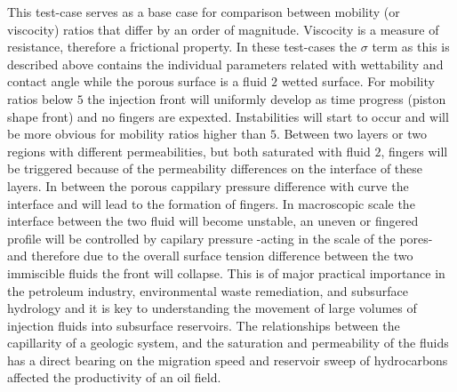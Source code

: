 \documentclass[preprint,authoryear,12pt]{elsarticle}
\begin{document}
{This test-case serves as a base case for comparison between mobility (or viscocity) ratios that differ by an order of magnitude. Viscocity is a measure of resistance, therefore a frictional property. In these test-cases the $\sigma$ term as this is described above contains the individual parameters related with wettability and contact angle while the porous surface is a fluid $2$ wetted surface. For mobility ratios below $5$ the injection front will uniformly develop as time progress (piston shape front) and no fingers are expexted. Instabilities will start to occur and will be more obvious for mobility ratios higher than $5$. Between two layers or two regions with different permeabilities, but both saturated with fluid $2$, fingers will be triggered because of the permeability differences on the interface of these layers. In between the porous cappilary pressure difference with curve the interface and will lead to the formation of fingers. In macroscopic scale the interface between the two fluid will become unstable, an uneven or fingered profile will be controlled by capilary pressure -acting in the scale of the pores- and therefore due to the overall surface tension difference between the two immiscible fluids the front will collapse. This is of major practical importance in the petroleum industry, environmental waste remediation, and subsurface hydrology and it is key to understanding the movement of large volumes of injection fluids into subsurface reservoirs. The relationships between the capillarity of a geologic system, and the saturation and permeability of the fluids has a direct bearing on the migration speed and reservoir sweep of hydrocarbons affected the productivity of an oil field.

}
\end{document}
